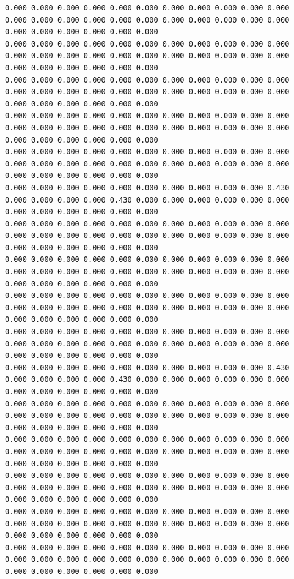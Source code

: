\begin{lstlisting}[caption= Input file for 4 well example , label=lst:wellfield]
0.000 0.000 0.000 0.000 0.000 0.000 0.000 0.000 0.000 0.000 0.000 0.000 0.000 0.000 0.000 0.000 0.000 0.000 0.000 0.000 0.000 0.000 0.000 0.000 0.000 0.000 0.000 0.000
0.000 0.000 0.000 0.000 0.000 0.000 0.000 0.000 0.000 0.000 0.000 0.000 0.000 0.000 0.000 0.000 0.000 0.000 0.000 0.000 0.000 0.000 0.000 0.000 0.000 0.000 0.000 0.000
0.000 0.000 0.000 0.000 0.000 0.000 0.000 0.000 0.000 0.000 0.000 0.000 0.000 0.000 0.000 0.000 0.000 0.000 0.000 0.000 0.000 0.000 0.000 0.000 0.000 0.000 0.000 0.000
0.000 0.000 0.000 0.000 0.000 0.000 0.000 0.000 0.000 0.000 0.000 0.000 0.000 0.000 0.000 0.000 0.000 0.000 0.000 0.000 0.000 0.000 0.000 0.000 0.000 0.000 0.000 0.000
0.000 0.000 0.000 0.000 0.000 0.000 0.000 0.000 0.000 0.000 0.000 0.000 0.000 0.000 0.000 0.000 0.000 0.000 0.000 0.000 0.000 0.000 0.000 0.000 0.000 0.000 0.000 0.000
0.000 0.000 0.000 0.000 0.000 0.000 0.000 0.000 0.000 0.000 0.430 0.000 0.000 0.000 0.000 0.430 0.000 0.000 0.000 0.000 0.000 0.000 0.000 0.000 0.000 0.000 0.000 0.000
0.000 0.000 0.000 0.000 0.000 0.000 0.000 0.000 0.000 0.000 0.000 0.000 0.000 0.000 0.000 0.000 0.000 0.000 0.000 0.000 0.000 0.000 0.000 0.000 0.000 0.000 0.000 0.000
0.000 0.000 0.000 0.000 0.000 0.000 0.000 0.000 0.000 0.000 0.000 0.000 0.000 0.000 0.000 0.000 0.000 0.000 0.000 0.000 0.000 0.000 0.000 0.000 0.000 0.000 0.000 0.000
0.000 0.000 0.000 0.000 0.000 0.000 0.000 0.000 0.000 0.000 0.000 0.000 0.000 0.000 0.000 0.000 0.000 0.000 0.000 0.000 0.000 0.000 0.000 0.000 0.000 0.000 0.000 0.000
0.000 0.000 0.000 0.000 0.000 0.000 0.000 0.000 0.000 0.000 0.000 0.000 0.000 0.000 0.000 0.000 0.000 0.000 0.000 0.000 0.000 0.000 0.000 0.000 0.000 0.000 0.000 0.000
0.000 0.000 0.000 0.000 0.000 0.000 0.000 0.000 0.000 0.000 0.430 0.000 0.000 0.000 0.000 0.430 0.000 0.000 0.000 0.000 0.000 0.000 0.000 0.000 0.000 0.000 0.000 0.000
0.000 0.000 0.000 0.000 0.000 0.000 0.000 0.000 0.000 0.000 0.000 0.000 0.000 0.000 0.000 0.000 0.000 0.000 0.000 0.000 0.000 0.000 0.000 0.000 0.000 0.000 0.000 0.000
0.000 0.000 0.000 0.000 0.000 0.000 0.000 0.000 0.000 0.000 0.000 0.000 0.000 0.000 0.000 0.000 0.000 0.000 0.000 0.000 0.000 0.000 0.000 0.000 0.000 0.000 0.000 0.000
0.000 0.000 0.000 0.000 0.000 0.000 0.000 0.000 0.000 0.000 0.000 0.000 0.000 0.000 0.000 0.000 0.000 0.000 0.000 0.000 0.000 0.000 0.000 0.000 0.000 0.000 0.000 0.000
0.000 0.000 0.000 0.000 0.000 0.000 0.000 0.000 0.000 0.000 0.000 0.000 0.000 0.000 0.000 0.000 0.000 0.000 0.000 0.000 0.000 0.000 0.000 0.000 0.000 0.000 0.000 0.000
0.000 0.000 0.000 0.000 0.000 0.000 0.000 0.000 0.000 0.000 0.000 0.000 0.000 0.000 0.000 0.000 0.000 0.000 0.000 0.000 0.000 0.000 0.000 0.000 0.000 0.000 0.000 0.000

\end{lstlisting}
